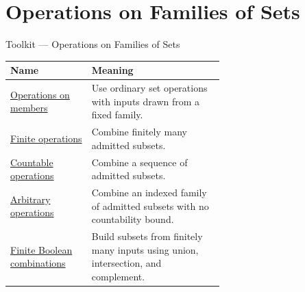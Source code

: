 \section{Operations on Families of Sets}

\begin{toolkitbox}{Toolkit --- Operations on Families of Sets}
\small
\begin{tabular}{l p{0.62\linewidth}}
\toprule
\textbf{Name} & \textbf{Meaning} \\
\midrule
\hyperref[def:operation-on-members-of-family]{Operations on members} &
Use ordinary set operations with inputs drawn from a fixed family. \\
\hyperref[def:finite-operation-on-family]{Finite operations} &
Combine finitely many admitted subsets. \\
\hyperref[def:countable-operation-on-family]{Countable operations} &
Combine a sequence of admitted subsets. \\
\hyperref[def:arbitrary-operation-on-family]{Arbitrary operations} &
Combine an indexed family of admitted subsets with no countability bound. \\
\hyperref[def:finite-boolean-combination]{Finite Boolean combinations} &
Build subsets from finitely many inputs using union, intersection, and
complement. \\
\bottomrule
\end{tabular}
\end{toolkitbox}







